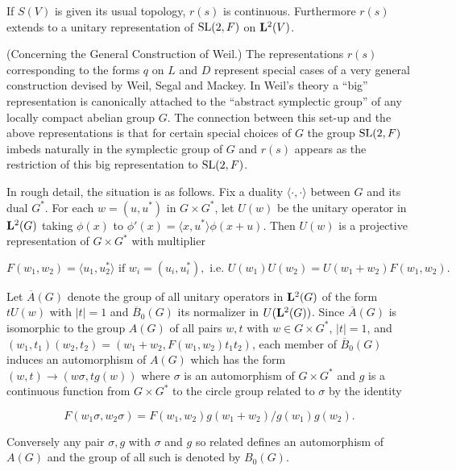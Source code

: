\begin{remark}\label{rem:7.1}

If $S(V)$ is given its usual topology, $r(s)$ is continuous. Furthermore $r(s)$ extends to a unitary representation of $\operatorname{SL}(2,F)$ on $\mathbf{L}^2(V)$.

\end{remark}

\begin{remark}\label{rem:7.2}

(Concerning the General Construction of Weil.) The representations $r(s)$ corresponding to the forms $q$ on $L$ and $D$ represent special cases of a very general construction devised by Weil, Segal and Mackey. In Weil's theory a ``big'' representation is canonically attached to the ``abstract symplectic group'' of any locally compact abelian group $G$. The connection between this set-up and the above representations is that for certain special choices of $G$ the group $\operatorname{SL}(2,F)$ imbeds naturally in the symplectic group of $G$ and $r(s)$ appears as the restriction of this big representation to $\operatorname{SL}(2,F)$.

In rough detail, the situation is as follows. Fix a duality $\langle \cdot, \cdot \rangle$ between $G$ and its dual $G^*$. For each $w = (u, u^*)$ in $G \times G^*$, let $U(w)$ be the unitary operator in $\mathbf{L}^2(G)$ taking $\phi(x)$ to $\phi'(x) = \langle x, u^*\rangle\phi(x + u)$. Then $U(w)$ is a projective representation of $G \times G^*$ with multiplier

\[
F(w_1, w_2) = \langle u_1, u_2^*\rangle \text{ if } w_i = (u_i, u_i^*), \text{ i.e.\ } U(w_1)U(w_2) = U(w_1 + w_2)F(w_1, w_2).
\]

Let $\overline{A}(G)$ denote the group of all unitary operators in $\mathbf{L}^2(G)$ of the form $tU(w)$ with $|t| = 1$ and $\overline{B}_0(G)$ its normalizer in $U(\mathbf{L}^2(G))$. Since $\overline{A}(G)$ is isomorphic to the group $A(G)$ of all pairs $w, t$ with $w \in G \times G^*$, $|t| = 1$, and $(w_1, t_1)(w_2, t_2) = (w_1 + w_2, F(w_1, w_2)t_1t_2)$, each member of $\overline{B}_0(G)$ induces an automorphism of $A(G)$ which has the form $(w, t) \to (w\sigma, tg(w))$ where $\sigma$ is an automorphism of $G \times G^*$ and $g$ is a continuous function from $G \times G^*$ to the circle group related to $\sigma$ by the identity

\[
F(w_1\sigma, w_2\sigma) = F(w_1, w_2)g(w_1 + w_2)/g(w_1)g(w_2).
\]

Conversely any pair $\sigma, g$ with $\sigma$ and $g$ so related defines an automorphism of $A(G)$ and the group of all such is denoted by $B_0(G)$.


\end{remark}
